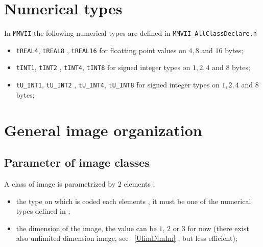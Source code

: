 
\section{Numerical types}

\label{NumericalType}

In {\tt MMVII} the following numerical types are defined in  {\tt MMVII\_AllClassDeclare.h}


\begin{itemize}
    \item {\tt tREAL4}, {\tt tREAL8} , {\tt tREAL16} for floatting point values on
	    $4,8$ and $16$ bytes;

    \item {\tt tINT1}, {\tt tINT2} , {\tt  tINT4}, {\tt  tINT8} for signed integer types
	    on $1,2,4$ and $8$ bytes;

    \item {\tt tU\_INT1}, {\tt tU\_INT2} , {\tt  tU\_INT4}, {\tt  tU\_INT8} for signed integer types
            on $1,2,4$ and $8$ bytes;
\end{itemize}




\section{General image organization}


\subsection{Parameter of image classes}

A class of image is parametrized by $2$ elements :

\begin{itemize}
   \item the type on which is coded each elements , it must be one of the numerical types
	   defined in \label{NumericalType};

   \item the dimension of the image,  the value can be $1$, $2$ or $3$ for now (there exist
	   also  unlimited dimension image, see ~\ref{UlimDimIm}  , but less efficient);
\end{itemize}


